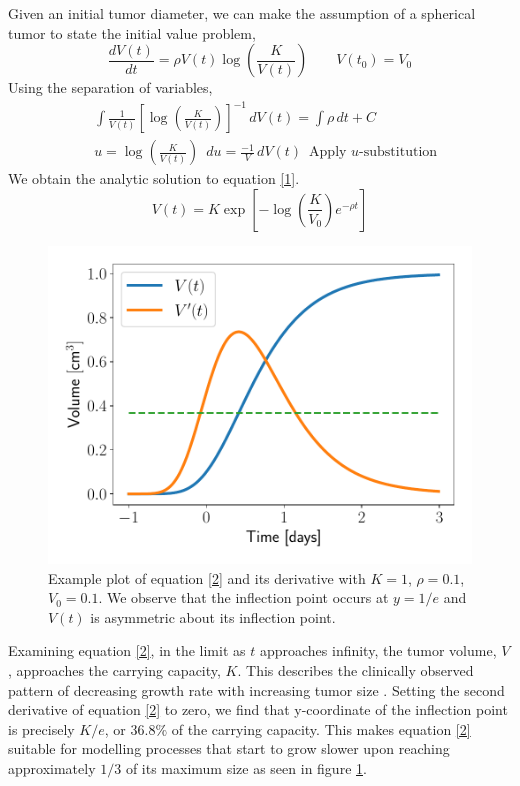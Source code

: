\documentclass[letterpaper
, superscriptaddress
, twocolumn
, aps
]{revtex4}
\begin{document}
Given an initial tumor diameter, we can make the assumption of a spherical tumor to state the initial value problem,
\begin{equation*}
\frac{dV(t)}{dt} = \rho V(t) \log \left( \frac{K}{V(t)}\right) \qquad V(t_{0}) = V_{0}
\end{equation*}
Using the separation of variables,
\begin{equation*}
\begin{aligned}
&\int \frac{1}{V(t)} \left[\log \left(\frac{K}{V(t)}\right)\right]^{-1}\,dV(t) = \int \rho \, dt + C\\
&u = \log \left(\frac{K}{V(t)}\right) \,\,\, du =\frac{-1}{V}\,dV(t)\,\,\, \text{Apply $u$-substitution}
\end{aligned}
\end{equation*}
We obtain the analytic solution to equation \eqref{1}.
\begin{equation} \label{2}
V(t) = K \exp \left[- \log \left(\frac{K}{V_{0}}\right) e^{-\rho t} \right]
\end{equation}

\begin{figure}[b]
	\includegraphics[width=1.00\columnwidth]{Figures/fig1.pdf}
	\caption{Example plot of equation \eqref{2} and its derivative with $K = 1$, $\rho = 0.1$, $V_{0} = 0.1$. We observe that the inflection point occurs at $y = 1/e$ and $V(t)$ is asymmetric about its inflection point.}
	\label{eq2}
\end{figure} 

Examining equation \eqref{2}, in the limit as $t$ approaches infinity, the tumor volume, $V$, approaches the carrying capacity, $K$. This describes the clinically observed pattern of decreasing growth rate with increasing tumor size \cite{Geng2017, Grassberger2016, Benzekry2014}. Setting the second derivative of equation \eqref{2} to zero, we find that y-coordinate of the inflection point is precisely $K/e$, or $36.8\%$ of the carrying capacity. This makes equation \eqref{2} suitable for modelling processes that start to grow slower upon reaching approximately $1/3$ of its maximum size as seen in figure \ref{eq2}.
\end{document}
